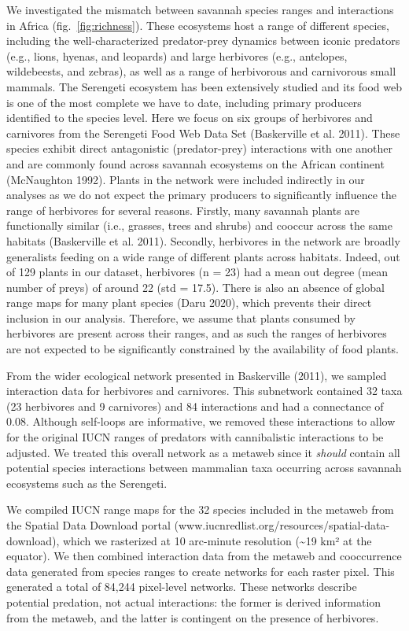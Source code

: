 \documentclass[10pt,oneside]{article}
\begin{document}
We investigated the mismatch between savannah species ranges and
interactions in Africa (fig.~\ref{fig:richness}). These ecosystems host
a range of different species, including the well-characterized
predator-prey dynamics between iconic predators (e.g., lions, hyenas,
and leopards) and large herbivores (e.g., antelopes, wildebeests, and
zebras), as well as a range of herbivorous and carnivorous small
mammals. The Serengeti ecosystem has been extensively studied and its
food web is one of the most complete we have to date, including primary
producers identified to the species level. Here we focus on six groups
of herbivores and carnivores from the Serengeti Food Web Data Set
(Baskerville et al. 2011). These species exhibit direct antagonistic
(predator-prey) interactions with one another and are commonly found
across savannah ecosystems on the African continent (McNaughton 1992).
Plants in the network were included indirectly in our analyses as we do
not expect the primary producers to significantly influence the range of
herbivores for several reasons. Firstly, many savannah plants are
functionally similar (i.e., grasses, trees and shrubs) and cooccur
across the same habitats (Baskerville et al. 2011). Secondly, herbivores
in the network are broadly generalists feeding on a wide range of
different plants across habitats. Indeed, out of 129 plants in our
dataset, herbivores (n = 23) had a mean out degree (mean number of
preys) of around 22 (std = 17.5). There is also an absence of global
range maps for many plant species (Daru 2020), which prevents their
direct inclusion in our analysis. Therefore, we assume that plants
consumed by herbivores are present across their ranges, and as such the
ranges of herbivores are not expected to be significantly constrained by
the availability of food plants.

From the wider ecological network presented in Baskerville (2011), we
sampled interaction data for herbivores and carnivores. This subnetwork
contained 32 taxa (23 herbivores and 9 carnivores) and 84 interactions
and had a connectance of 0.08. Although self-loops are informative, we
removed these interactions to allow for the original IUCN ranges of
predators with cannibalistic interactions to be adjusted. We treated
this overall network as a metaweb since it \emph{should} contain all
potential species interactions between mammalian taxa occurring across
savannah ecosystems such as the Serengeti.

We compiled IUCN range maps for the 32 species included in the metaweb
from the Spatial Data Download portal
(www.iucnredlist.org/resources/spatial-data-download), which we
rasterized at 10 arc-minute resolution (\textasciitilde19 km² at the
equator). We then combined interaction data from the metaweb and
cooccurrence data generated from species ranges to create networks for
each raster pixel. This generated a total of 84,244 pixel-level
networks. These networks describe potential predation, not actual
interactions: the former is derived information from the metaweb, and
the latter is contingent on the presence of herbivores.
\end{document}
